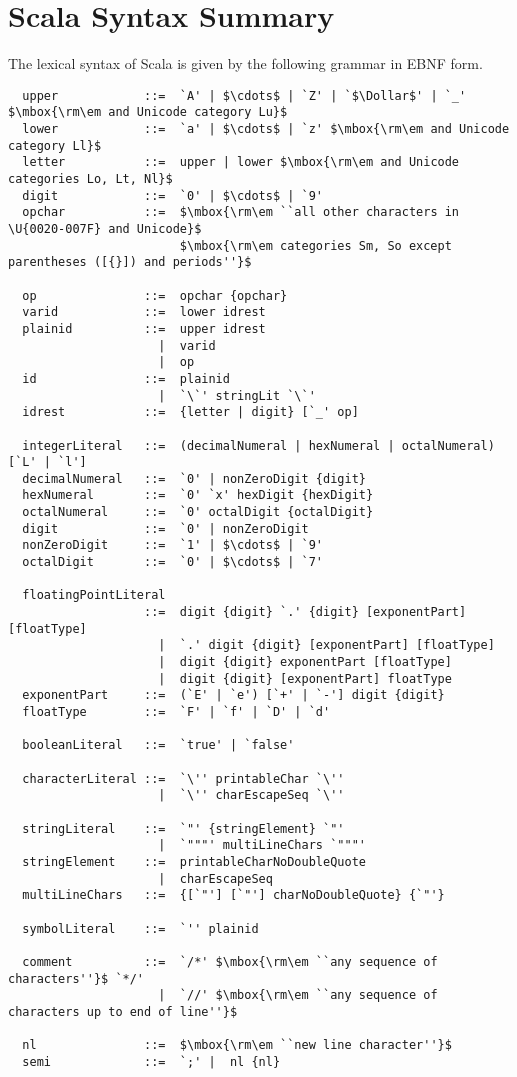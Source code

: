 
\chapter{Scala Syntax Summary}\label{sec:syntax}

The lexical syntax of Scala is given by the following grammar in EBNF
form.

{\small
\begin{lstlisting}
  upper            ::=  `A' | $\cdots$ | `Z' | `$\Dollar$' | `_' $\mbox{\rm\em and Unicode category Lu}$
  lower            ::=  `a' | $\cdots$ | `z' $\mbox{\rm\em and Unicode category Ll}$
  letter           ::=  upper | lower $\mbox{\rm\em and Unicode categories Lo, Lt, Nl}$
  digit            ::=  `0' | $\cdots$ | `9'
  opchar           ::=  $\mbox{\rm\em ``all other characters in \U{0020-007F} and Unicode}$
                        $\mbox{\rm\em categories Sm, So except parentheses ([{}]) and periods''}$

  op               ::=  opchar {opchar} 
  varid            ::=  lower idrest
  plainid          ::=  upper idrest
                     |  varid
                     |  op
  id               ::=  plainid
                     |  `\`' stringLit `\`'
  idrest           ::=  {letter | digit} [`_' op]

  integerLiteral   ::=  (decimalNumeral | hexNumeral | octalNumeral) [`L' | `l']
  decimalNumeral   ::=  `0' | nonZeroDigit {digit}
  hexNumeral       ::=  `0' `x' hexDigit {hexDigit}
  octalNumeral     ::=  `0' octalDigit {octalDigit}
  digit            ::=  `0' | nonZeroDigit
  nonZeroDigit     ::=  `1' | $\cdots$ | `9'
  octalDigit       ::=  `0' | $\cdots$ | `7'

  floatingPointLiteral 
                   ::=  digit {digit} `.' {digit} [exponentPart] [floatType]
                     |  `.' digit {digit} [exponentPart] [floatType]
                     |  digit {digit} exponentPart [floatType]
                     |  digit {digit} [exponentPart] floatType
  exponentPart     ::=  (`E' | `e') [`+' | `-'] digit {digit}
  floatType        ::=  `F' | `f' | `D' | `d'

  booleanLiteral   ::=  `true' | `false'

  characterLiteral ::=  `\'' printableChar `\''
                     |  `\'' charEscapeSeq `\''

  stringLiteral    ::=  `"' {stringElement} `"'
                     |  `"""' multiLineChars `"""'
  stringElement    ::=  printableCharNoDoubleQuote 
                     |  charEscapeSeq
  multiLineChars   ::=  {[`"'] [`"'] charNoDoubleQuote} {`"'}

  symbolLiteral    ::=  `'' plainid

  comment          ::=  `/*' $\mbox{\rm\em ``any sequence of characters''}$ `*/'
                     |  `//' $\mbox{\rm\em ``any sequence of characters up to end of line''}$

  nl               ::=  $\mbox{\rm\em ``new line character''}$
  semi             ::=  `;' |  nl {nl}       
\end{lstlisting}}

